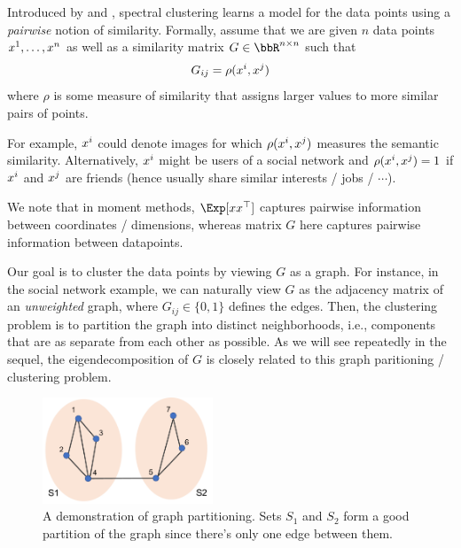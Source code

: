 \label{section:spectral_clustering}
Introduced by \citet{shi2000normalized} and \citet{ng2001spectral}, spectral clustering learns a model for the data points using a \emph{pairwise} notion of similarity. Formally, assume that we are given $n$ data points $x\sp{1}, \dots, x\sp{n}$ as well as a similarity matrix $G \in \bbR^{n\times n}$ such that 
\begin{equation}
    G_{ij} = \rho (x\sp{i}, x\sp{j})
\end{equation}
where $\rho$ is some measure of similarity that assigns larger values to more similar pairs of points. 

For example, $x\sp{i}$ could denote images for which $\rho (x\sp{i}, x\sp{j})$ measures the semantic similarity. Alternatively, $x\sp{i}$ might be users of a social network and $\rho (x\sp{i}, x\sp{j}) = 1$ if $x\sp{i}$ and $x\sp{j}$ are friends (hence usually share similar interests / jobs / $\cdots$). 

We note that in moment methods, $\Exp[xx^\top]$ captures pairwise information between coordinates / dimensions, whereas matrix $G$ here captures pairwise information between datapoints.

Our goal is to cluster the data points by viewing $G$ as a graph. For instance, in the social network example, we can naturally view $G$ as the adjacency matrix of an \emph{unweighted} graph, where $G_{ij} \in \{0, 1\}$ defines the edges. Then, the clustering problem is to partition the graph into distinct neighborhoods, i.e., components that are as separate from each other as possible. As we will see repeatedly in the sequel, the eigendecomposition of $G$ is closely related to this graph paritioning / clustering problem.

\begin{figure}[ht]
	\centering
	\includegraphics[width=2in]{figures/ssl1.pdf}
	\caption{A demonstration of graph partitioning. Sets $S_1$ and $S_2$ form a good partition of the graph since there's only one edge between them.}
\end{figure}



